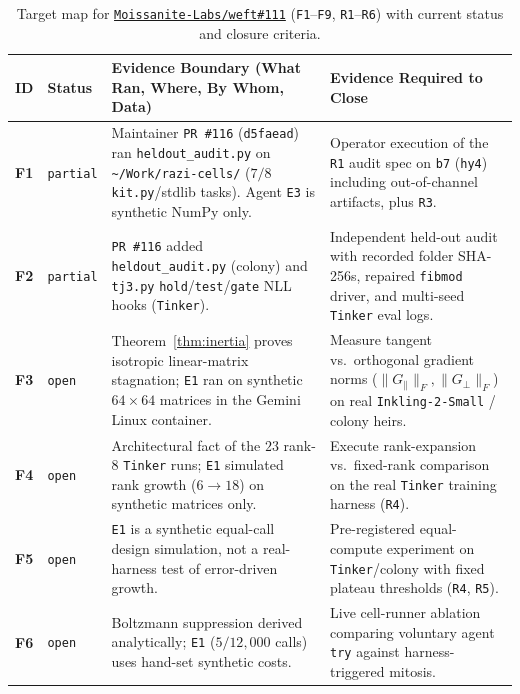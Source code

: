 \documentclass[10pt,a4paper]{article}
\begin{document}
\begin{table}[!htbp]
\centering
\caption{Target map for \href{https://github.com/Moissanite-Labs/weft/issues/111}{\texttt{Moissanite-Labs/weft\#111}} (\texttt{F1}--\texttt{F9}, \texttt{R1}--\texttt{R6}) with current status and closure criteria.}
\label{tab:issue111}
\scriptsize
\setlength{\tabcolsep}{3.5pt}
\renewcommand{\arraystretch}{1.12}
\begin{tabularx}{\linewidth}{@{}l l >{\raggedright\arraybackslash}X >{\raggedright\arraybackslash}X@{}}
\toprule
\textbf{ID} & \textbf{Status} & \textbf{Evidence Boundary (What Ran, Where, By Whom, Data)} & \textbf{Evidence Required to Close} \\
\midrule
\textbf{F1} & \texttt{partial} & Maintainer \texttt{PR \#116} (\texttt{d5faead}) ran \texttt{heldout\_audit.py} on \texttt{\textasciitilde/Work/razi-cells/} ($7/8$ \texttt{kit.py}/stdlib tasks). Agent \texttt{E3} is synthetic NumPy only. & Operator execution of the \texttt{R1} audit spec on \texttt{b7} (\texttt{hy4}) including out-of-channel artifacts, plus \texttt{R3}. \\
\textbf{F2} & \texttt{partial} & \texttt{PR \#116} added \texttt{heldout\_audit.py} (colony) and \texttt{tj3.py} \texttt{hold}/\texttt{test}/\texttt{gate} NLL hooks (\texttt{Tinker}). & Independent held-out audit with recorded folder SHA-256s, repaired \texttt{fibmod} driver, and multi-seed \texttt{Tinker} eval logs. \\
\textbf{F3} & \texttt{open} & Theorem~\ref{thm:inertia} proves isotropic linear-matrix stagnation; \texttt{E1} ran on synthetic $64\times 64$ matrices in the Gemini Linux container. & Measure tangent vs.\ orthogonal gradient norms ($\|G_\parallel\|_F, \|G_\perp\|_F$) on real \texttt{Inkling-2-Small} / colony heirs. \\
\textbf{F4} & \texttt{open} & Architectural fact of the $23$ rank-8 \texttt{Tinker} runs; \texttt{E1} simulated rank growth ($6\to 18$) on synthetic matrices only. & Execute rank-expansion vs.\ fixed-rank comparison on the real \texttt{Tinker} training harness (\texttt{R4}). \\
\textbf{F5} & \texttt{open} & \texttt{E1} is a synthetic equal-call design simulation, not a real-harness test of error-driven growth. & Pre-registered equal-compute experiment on \texttt{Tinker}/colony with fixed plateau thresholds (\texttt{R4}, \texttt{R5}). \\
\textbf{F6} & \texttt{open} & Boltzmann suppression derived analytically; \texttt{E1} ($5/12{,}000$ calls) uses hand-set synthetic costs. & Live cell-runner ablation comparing voluntary agent \texttt{try} against harness-triggered mitosis. \\

\end{tabularx}
\end{table}
\end{document}

